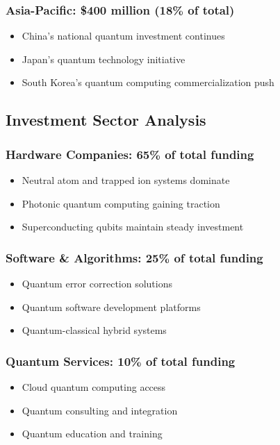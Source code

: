 \documentclass[12pt,a4paper]{article}
\begin{document}
\subsubsection{Asia-Pacific: \$400 million (18\% of total)}
\begin{itemize}
    \item China's national quantum investment continues
    \item Japan's quantum technology initiative
    \item South Korea's quantum computing commercialization push
\end{itemize}

\subsection{Investment Sector Analysis}

\subsubsection{Hardware Companies: 65\% of total funding}
\begin{itemize}
    \item Neutral atom and trapped ion systems dominate
    \item Photonic quantum computing gaining traction
    \item Superconducting qubits maintain steady investment
\end{itemize}

\subsubsection{Software \& Algorithms: 25\% of total funding}
\begin{itemize}
    \item Quantum error correction solutions
    \item Quantum software development platforms
    \item Quantum-classical hybrid systems
\end{itemize}

\subsubsection{Quantum Services: 10\% of total funding}
\begin{itemize}
    \item Cloud quantum computing access
    \item Quantum consulting and integration
    \item Quantum education and training
\end{itemize}
\end{document}
